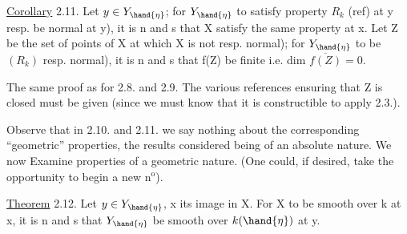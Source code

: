 
\uline{Corollary} 2.11. Let $y\in Y_{\hand{\eta}}$; for $Y_{\hand{\eta}}$ to  satisfy property
$R_k$ (ref) at y\hand{,} resp. be normal at y), it is n and s that X satisfy
the same property at x.  Let Z be the set of points of X at
which X is not resp.  normal); for $Y_{\hand{\eta}}$ to be
 $(R_k)$\hand{,} resp. normal), it is n and s that f(Z) be finite i.e. dim $\overline{f(Z)}=0$.

 The same proof as for 2.8. and 2.9. The various
references ensuring that Z is closed must be given (since we must know that it is
constructible to apply 2.3.).

 Observe that in 2.10. and 2.11. we say nothing
about the corresponding ``geometric'' properties, the results
considered being of an absolute nature. We now Examine
properties of a geometric nature. (One could, if desired, take the
opportunity to begin a new n$^{\text{o}}$).

\uline{Theorem} 2.12. Let $y\in Y_{\hand{\eta}}$, x its image in X. For X to be
smooth over k at x, it is n and s that $Y_{\hand{\eta}}$ be smooth over $k(\hand{\eta})$ at y.

